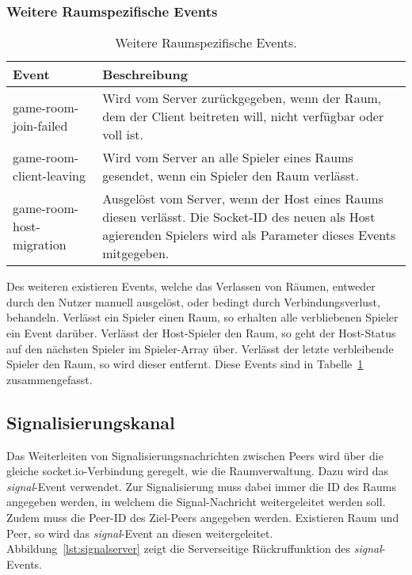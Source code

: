 \subsubsection{Weitere Raumspezifische Events}
\begin{table}[ht]
\centering
\begin{tabularx}{\textwidth}{lX}
\toprule
Event&Beschreibung\\

\midrule
game-room-join-failed&Wird vom Server zurückgegeben, wenn der Raum, dem der Client beitreten will, nicht verfügbar oder voll ist.\\
game-room-client-leaving&Wird vom Server an alle Spieler eines Raums gesendet, wenn ein Spieler den Raum verlässt.\\
game-room-host-migration&Ausgelöst vom Server, wenn der Host eines Raums diesen verlässt. Die Socket-ID des neuen als Host agierenden Spielers wird als Parameter dieses Events mitgegeben.\\
\bottomrule

\end{tabularx}
\caption{Weitere Raumspezifische Events.}
\label{table:otherevents}
\end{table}

Des weiteren existieren Events, welche das Verlassen von Räumen, entweder durch den Nutzer manuell ausgelöst, oder bedingt durch Verbindungsverlust, behandeln. Verlässt ein Spieler einen Raum, so erhalten alle verbliebenen Spieler ein Event darüber. Verlässt der Host-Spieler den Raum, so geht der Host-Status auf den nächsten Spieler im Spieler-Array über. Verlässt der letzte verbleibende Spieler den Raum, so wird dieser entfernt. Diese Events sind in Tabelle~\ref{table:otherevents} zusammengefasst.\par

\subsection{Signalisierungskanal}
Das Weiterleiten von Signalisierungsnachrichten zwischen Peers wird über die gleiche socket.io-Verbindung geregelt, wie die Raumverwaltung. Dazu wird das \textit{signal}-Event verwendet. Zur Signalisierung muss dabei immer die ID des Raums angegeben werden, in welchem die Signal-Nachricht weitergeleitet werden soll. Zudem muss die Peer-ID des Ziel-Peers angegeben werden. Existieren Raum und Peer, so wird das \textit{signal}-Event an diesen weitergeleitet. Abbildung~\ref{lst:signalserver} zeigt die Serverseitige Rückruffunktion des \textit{signal}-Events.

